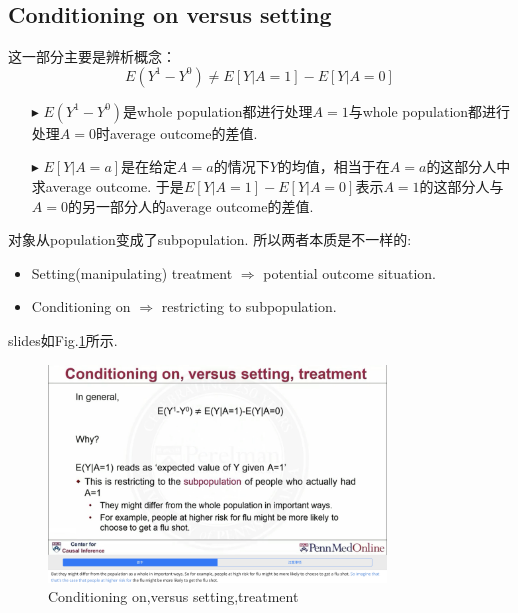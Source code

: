 \subsection{Conditioning on versus setting}
这一部分主要是辨析概念：
\begin{equation}
E(Y^1-Y^0) \neq E[Y|A=1]- E[Y|A=0]
\end{equation}
\begin{itemize}[itemindent = 0em]
    \item[$\blacktriangleright$]$E(Y^1-Y^0)$是whole population都进行处理$A=1$与whole population都进行处理$A=0$时average outcome的差值. 
    \item[$\blacktriangleright$]$E[Y|A=a]$是在给定$A=a$的情况下$Y$的均值，相当于在$A=a$的这部分人中求average outcome. 于是$E[Y|A=1]-E[Y|A=0]$表示$A=1$的这部分人与$A=0$的另一部分人的average outcome的差值.
\end{itemize}

对象从population变成了subpopulation. 所以两者本质是不一样的:
\begin{itemize}[itemindent = 2em]
	\item Setting(manipulating) treatment $\Longrightarrow$ potential outcome situation.
    \item Conditioning on $\Longrightarrow$ restricting to subpopulation.
\end{itemize}

slides如Fig.\ref{versus}所示.
\begin{figure}[htbp]
	\setlength{\abovecaptionskip}{0pt}     %
	\setlength{\belowcaptionskip}{10pt}
	\vspace{-0cm}  %
	\setlength{\abovecaptionskip}{-0cm}   %
	\setlength{\belowcaptionskip}{0cm}   %
	\centering
	\includegraphics[width=0.8\textwidth]{figure/versus.jpg}
	\caption{Conditioning on,versus setting,treatment}
	\label{versus}
\end{figure}
	
